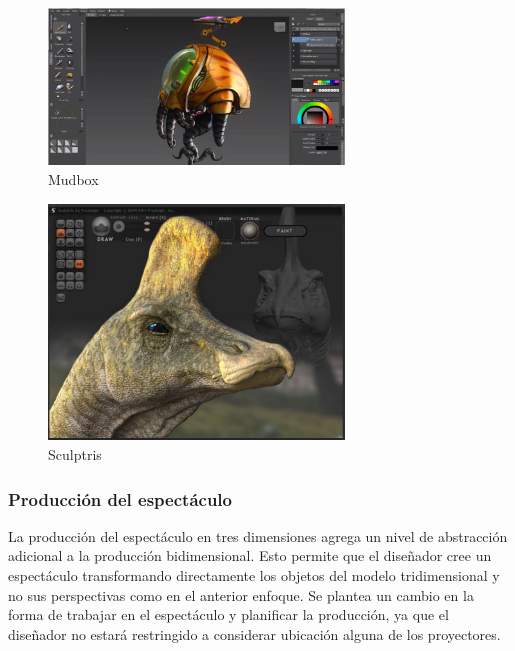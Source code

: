 \begin{figure}[H]
  \centering
    \includegraphics[width=0.7\textwidth]{./Cap2_videomapping/mudbox.png}
  \caption[http://usa.autodesk.com/adsk/servlet/pc/index?id=13565063\&siteID=123112]{Mudbox}
  \label{fig:Mudbox}
\end{figure}

\begin{figure}[H]
  \centering
    \includegraphics[width=0.7\textwidth]{./Cap2_videomapping/sculptris.png}
  \caption[http://www.pixologic.com/sculptris/]{Sculptris}
  \label{fig:Sculptris}
\end{figure}
  
\subsubsection{Producción del espectáculo}
La producción del espectáculo en tres dimensiones agrega un nivel de abstracción adicional a la producción bidimensional. Esto permite que el diseñador cree un espectáculo transformando directamente los objetos del modelo tridimensional y no sus perspectivas como en el anterior enfoque.
Se plantea un cambio en la forma de trabajar en el espectáculo y planificar la producción, ya que el diseñador no estará restringido a considerar ubicación alguna de los proyectores.

